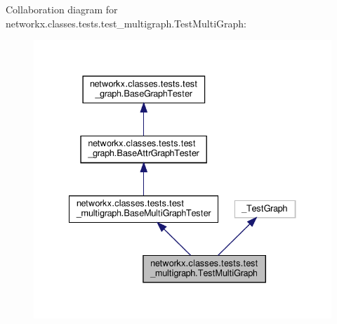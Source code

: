 Collaboration diagram for networkx.\+classes.\+tests.\+test\+\_\+multigraph.\+Test\+Multi\+Graph\+:
\nopagebreak
\begin{figure}[H]
\begin{center}
\leavevmode
\includegraphics[width=334pt]{classnetworkx_1_1classes_1_1tests_1_1test__multigraph_1_1TestMultiGraph__coll__graph}
\end{center}
\end{figure}
